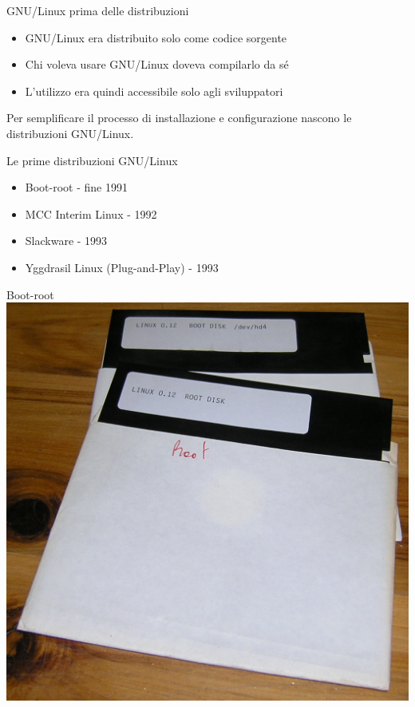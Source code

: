 \begin{frame}{GNU/Linux prima delle distribuzioni}
    \begin{itemize}
        \item GNU/Linux era distribuito solo come codice sorgente
        \item Chi voleva usare GNU/Linux doveva compilarlo da sé
        \item L'utilizzo era quindi accessibile solo agli sviluppatori
    \end{itemize}
    \hfill \break
    Per semplificare il processo di installazione e configurazione nascono le distribuzioni GNU/Linux.
\end{frame}


\begin{frame}{Le prime distribuzioni GNU/Linux}
    \begin{itemize}
        \item Boot-root - fine 1991
        \item MCC Interim Linux - 1992
        \item Slackware - 1993
        \item Yggdrasil Linux (Plug-and-Play) - 1993
    \end{itemize}
\end{frame}

\begin{frame}{Boot-root}
    \centering
    \includegraphics[scale=0.14]{images/Linux_0_12.jpg}
\end{frame}

